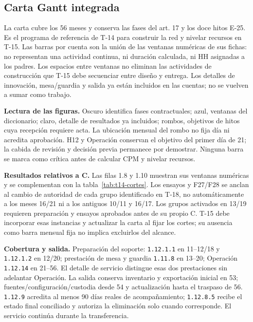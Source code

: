 \subsection{Carta Gantt integrada}
La carta cubre los 56 meses y conserva las fases del art. 17 y los doce hitos E-25. Es el programa de referencia de T-14 para construir la red y nivelar recursos en T-15. Las barras por cuenta son la unión de las ventanas numéricas de sus fichas: no representan una actividad continua, ni duración calculada, ni HH asignadas a los padres. Los espacios entre ventanas no eliminan las actividades de construcción que T-15 debe secuenciar entre diseño y entrega. Los detalles de innovación, mesa/guardia y salida ya están incluidos en las cuentas; no se vuelven a sumar como trabajo.

\textbf{Lectura de las figuras.} Oscuro identifica fases contractuales; azul, ventanas del diccionario; claro, detalle de resultados ya incluidos; rombos, objetivos de hitos cuya recepción requiere acta. La ubicación mensual del rombo no fija día ni acredita aprobación. H12 y Operación conservan el objetivo del primer día de 21; la cabida de revisión y decisión previa permanece por demostrar. Ninguna barra se marca como crítica antes de calcular CPM y nivelar recursos.

\textbf{Resultados relativos a C.} Las filas 1.8 y 1.10 muestran sus ventanas numéricas y se complementan con la tabla~\ref{tab:t14-cortes}. Los ensayos y F27/F28 se anclan al cambio de autoridad de cada grupo identificado en T-18, no automáticamente a los meses 16/21 ni a los antiguos 10/11 y 16/17. Los grupos activados en 13/19 requieren preparación y ensayos aprobados antes de su propio C. T-15 debe incorporar esas instancias y actualizar la carta al fijar los cortes; su ausencia como barra mensual fija no implica excluirlos del alcance.

\textbf{Cobertura y salida.} Preparación del soporte: \texttt{1.12.1.1} en 11--12/18 y \texttt{1.12.1.2} en 12/20; prestación de mesa y guardia \texttt{1.11.8} en 13--20; Operación \texttt{1.12.14} en 21--56. El detalle de servicio distingue esas dos prestaciones sin adelantar Operación. La salida conserva inventario y exportación inicial en 53; fuentes/configuración/custodia desde 54 y actualización hasta el traspaso de 56. \texttt{1.12.9} acredita al menos 90 días reales de acompañamiento; \texttt{1.12.8.5} recibe el estado final conciliado y autoriza la eliminación solo cuando corresponde. El servicio continúa durante la transferencia.

